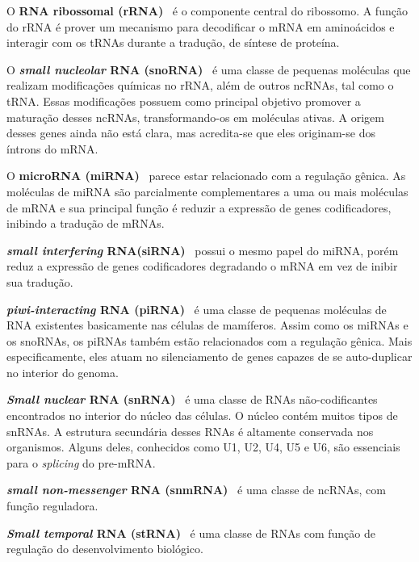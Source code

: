 O \textbf{RNA ribossomal (rRNA)}~\citep{eddy2001non:2001} é o componente central do ribossomo. A função do rRNA é prover um mecanismo para decodificar o mRNA em aminoácidos e interagir com os tRNAs durante a tradução, de síntese de proteína.

O \textbf{\textit{small nucleolar} RNA (snoRNA)}~\citep{durbin1998biological:1998} é uma classe de pequenas moléculas que realizam modificações químicas no rRNA, além de outros ncRNAs, tal como o tRNA. Essas modificações possuem como principal objetivo promover a maturação desses ncRNAs, transformando-os em moléculas ativas. A origem desses genes ainda não está clara, mas acredita-se que eles originam-se dos íntrons do mRNA.

O \textbf{microRNA (miRNA)}~\citep{mendell2005micrornas:2005} parece estar relacionado com a regulação gênica. As moléculas de miRNA são parcialmente complementares a uma ou mais moléculas de mRNA e sua principal função é reduzir a expressão de genes codificadores, inibindo a tradução de mRNAs.

\textbf{\textit{small interfering} RNA(siRNA)}~\citep{eddy2001non:2001} possui o mesmo papel do miRNA, porém reduz a expressão de genes codificadores degradando o mRNA em vez de inibir sua tradução.

\textbf{\textit{piwi-interacting} RNA (piRNA)}~\citep{brennecke2007discrete:2007} é uma classe de pequenas moléculas de RNA existentes basicamente nas células de mamíferos. Assim como os miRNAs e os snoRNAs, os piRNAs também estão relacionados com a regulação gênica. Mais especificamente, eles atuam no silenciamento de genes capazes de se auto-duplicar no interior do genoma.



\textbf{\textit{Small nuclear} RNA (snRNA)}~\citep{stryer:2002} é uma classe de RNAs não-codificantes encontrados no interior do núcleo das células. O núcleo contém muitos tipos de snRNAs. A estrutura secundária desses RNAs é altamente conservada nos organismos. Alguns deles, conhecidos como U1, U2, U4, U5 e U6, são essenciais para o \textit{splicing} do pre-mRNA.


\textbf{\textit{small non-messenger} RNA (snmRNA)}~\citep{huttenhofer2001rnomics:2001} é uma classe de ncRNAs, com função reguladora.


\textbf{\textit{Small temporal} RNA (stRNA)}~\citep{eddy2001non:2001} é uma classe de RNAs com função de regulação do desenvolvimento biológico.


